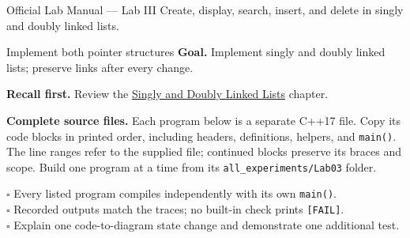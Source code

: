 
\begin{sourcealignment}{Official Lab Manual --- Lab III}
Create, display, search, insert, and delete in singly and doubly linked lists.
\end{sourcealignment}

\begin{labproject}{Implement both pointer structures}
\textbf{Goal.} Implement singly and doubly linked lists; preserve links after every change.

\textbf{Recall first.} Review the \hyperref[ch:linked-lists]{Singly and Doubly Linked Lists} chapter.

\textbf{Complete source files.} Each program below is a separate C++17 file.
Copy its code blocks in printed order, including headers, definitions, helpers, and \texttt{main()}.
The line ranges refer to the supplied file; continued blocks preserve its braces and scope.
Build one program at a time from its \texttt{all\_experiments/Lab03} folder.



\tcbbreak

\end{labproject}

\begin{verification}
$\square$ Every listed program compiles independently with its own \texttt{main()}.\\
$\square$ Recorded outputs match the traces; no built-in check prints \texttt{[FAIL]}.\\
$\square$ Explain one code-to-diagram state change and demonstrate one additional test.
\end{verification}

